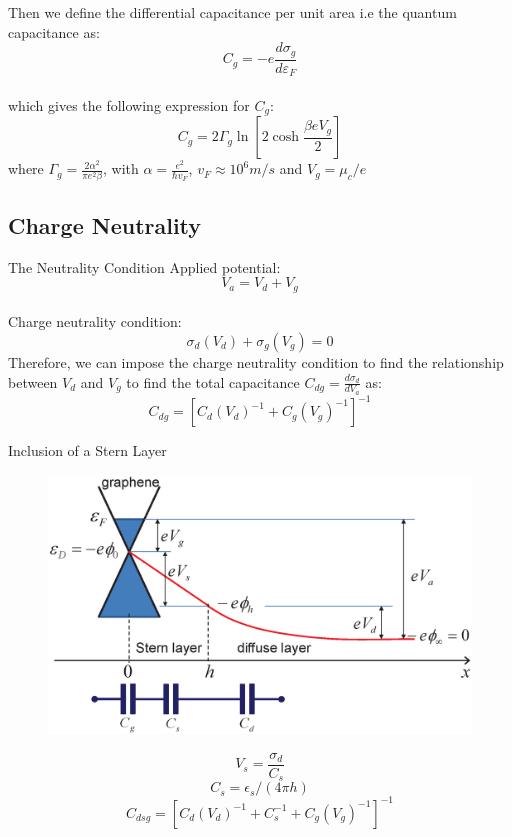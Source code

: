 \documentclass{beamer}
\begin{document}
\begin{frame}
Then we define the differential capacitance per unit area i.e the quantum capacitance as: $$C_g = -e \frac{d\sigma_g}{d\varepsilon_F} $$ \\
which gives the following expression for $C_g$:
$$C_g = 2 \Gamma_g \ln[2\cosh{\frac{\beta e V_g}{2}}] $$
where $\Gamma_g = \frac{2 \alpha^2}{\pi e^2 \beta}$, with $\alpha = \frac{e^2}{\hbar v_F}$, $v_F \approx 10^6 m/s$ and $V_g=\mu_c/e$\\
\vspace{1em}
\end{frame}

\subsection{Charge Neutrality}
\begin{frame}{The Neutrality Condition}
Applied potential:
$$V_a = V_d + V_g $$ \\
Charge neutrality condition:
$$\sigma_d(V_d) + \sigma_g(V_g) = 0 $$
Therefore, we can impose the charge neutrality condition to find the relationship between $V_d$ and $V_g$ to find
the total capacitance $C_{dg} = \frac{d\sigma_d}{dV_a}$ as:
$$C_{dg} = [C_{d}(V_d)^{-1} + C_g(V_g)^{-1}]^{-1}$$

\end{frame}
\begin{frame}{Inclusion of a Stern Layer}
\begin{figure}[!h]
    \begin{center}
    \includegraphics[scale=0.27]{graphenepotential.eps}
    \end{center}
\end{figure}
$$V_s = \frac{\sigma_d}{C_s}$$
$$C_s=\epsilon_s/(4\pi h)$$
$$C_{dsg} = [C_{d}(V_d)^{-1} + C_s ^{-1} + C_g(V_g)^{-1}]^{-1}$$

\end{frame}{}
\end{document}
